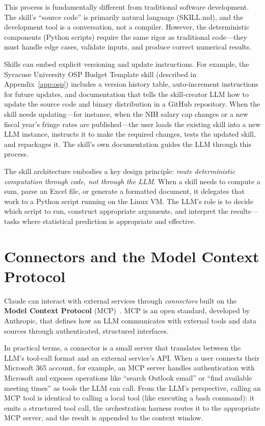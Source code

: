 \documentclass[12pt]{article}
\begin{document}
This process is fundamentally different from traditional software development. The skill's ``source code'' is primarily natural language (SKILL.md), and the development tool is a conversation, not a compiler. However, the deterministic components (Python scripts) require the same rigor as traditional code---they must handle edge cases, validate inputs, and produce correct numerical results.

Skills can embed explicit versioning and update instructions. For example, the Syracuse University OSP Budget Template skill (described in Appendix~\ref{app:osp}) includes a version history table, auto-increment instructions for future updates, and documentation that tells the skill-creator LLM how to update the source code and binary distribution in a GitHub repository. When the skill needs updating---for instance, when the NIH salary cap changes or a new fiscal year's fringe rates are published---the user loads the existing skill into a new LLM instance, instructs it to make the required changes, tests the updated skill, and repackages it. The skill's own documentation guides the LLM through this process.

The skill architecture embodies a key design principle: \emph{route deterministic computation through code, not through the LLM}. When a skill needs to compute a sum, parse an Excel file, or generate a formatted document, it delegates that work to a Python script running on the Linux VM. The LLM's role is to decide which script to run, construct appropriate arguments, and interpret the results---tasks where statistical prediction is appropriate and effective.

\section{Connectors and the Model Context Protocol}
\label{sec:mcp}

Claude can interact with external services through \emph{connectors} built on the \textbf{Model Context Protocol} (MCP)~\cite{anthropic_mcp}. MCP is an open standard, developed by Anthropic, that defines how an LLM communicates with external tools and data sources through authenticated, structured interfaces.

In practical terms, a connector is a small server that translates between the LLM's tool-call format and an external service's API. When a user connects their Microsoft 365 account, for example, an MCP server handles authentication with Microsoft and exposes operations like ``search Outlook email'' or ``find available meeting times'' as tools the LLM can call. From the LLM's perspective, calling an MCP tool is identical to calling a local tool (like executing a bash command): it emits a structured tool call, the orchestration harness routes it to the appropriate MCP server, and the result is appended to the context window.
\end{document}
